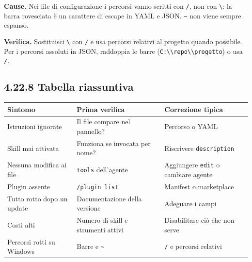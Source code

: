 \documentclass[
  italian,
  10pt,
]{book}
\newcounter{none} %
\begin{document}
\textbf{Cause.} Nei file di configurazione i percorsi vanno scritti con
\texttt{/}, non con \texttt{\textbackslash{}}: la barra rovesciata è un
carattere di escape in YAML e JSON. \texttt{\textasciitilde{}} non viene
sempre espanso.

\textbf{Verifica.} Sostituisci \texttt{\textbackslash{}} con \texttt{/}
e usa percorsi relativi al progetto quando possibile. Per i percorsi
assoluti in JSON, raddoppia le barre
(\texttt{C:\textbackslash{}\textbackslash{}repo\textbackslash{}\textbackslash{}progetto})
o usa \texttt{/}.

\subsection{4.22.8 Tabella riassuntiva}\label{tabella-riassuntiva}

{\def\LTcaptype{none} %
\begin{longtable}[]{@{}
  >{\raggedright\arraybackslash}p{}
  >{\raggedright\arraybackslash}p{}
  >{\raggedright\arraybackslash}p{}@{}}
\toprule\noalign{}
\begin{minipage}[b]{\linewidth}\raggedright
Sintomo
\end{minipage} & \begin{minipage}[b]{\linewidth}\raggedright
Prima verifica
\end{minipage} & \begin{minipage}[b]{\linewidth}\raggedright
Correzione tipica
\end{minipage} \\
\midrule\noalign{}
\endhead
\bottomrule\noalign{}
\endlastfoot
Istruzioni ignorate & Il file compare nel pannello? & Percorso o YAML \\
Skill mai attivata & Funziona se invocata per nome? & Riscrivere
\texttt{description} \\
Nessuna modifica ai file & \texttt{tools} dell'agente & Aggiungere
\texttt{edit} o cambiare agente \\
Plugin assente & \texttt{/plugin\ list} & Manifest o marketplace \\
Tutto rotto dopo un update & Documentazione della versione & Adeguare i
campi \\
Costi alti & Numero di skill e strumenti attivi & Disabilitare ciò che
non serve \\
Percorsi rotti su Windows & Barre e \texttt{\textasciitilde{}} &
\texttt{/} e percorsi relativi \\
\end{longtable}
}
\end{document}
